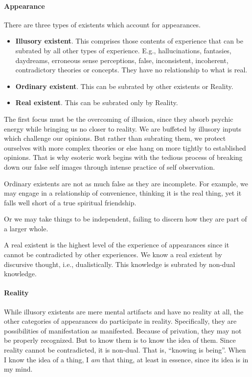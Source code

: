 \paragraph{Appearance}
There are three types of existents which account for appearances.

\begin{itemize}
\item \textbf{Illusory existent}. This comprises those contents of experience that can be subrated by all other types of experience. E.g., hallucinations, fantasies, daydreams, erroneous sense perceptions, false, inconsistent, incoherent, contradictory theories or concepts. They have no relationship to what is real. 
\item \textbf{Ordinary existent}. This can be subrated by other existents or Reality. 
\item \textbf{Real existent}. This can be subrated only by Reality. 
\end{itemize}
The first focus must be the overcoming of illusion, since they absorb psychic energy while bringing us no closer to reality. We are buffeted by illusory inputs which challenge our opinions. But rather than subrating them, we protect ourselves with more complex theories or else hang on more tightly to established opinions. That is why esoteric work begins with the tedious process of breaking down our false self images through intense practice of self observation.

Ordinary existents are not as much false as they are incomplete. For example, we may engage in a relationship of convenience, thinking it is the real thing, yet it falls well short of a true spiritual friendship.

Or we may take things to be independent, failing to discern how they are part of a larger whole.

A real existent is the highest level of the experience of appearances since it cannot be contradicted by other experiences. We know a real existent by discursive thought, i.e., dualistically. This knowledge is subrated by non-dual knowledge.

\paragraph{Reality}
While illusory existents are mere mental artifacts and have no reality at all, the other categories of appearances do participate in reality. Specifically, they are possibilities of manifestation as manifested. Because of privation, they may not be properly recognized. But to know them is to know the idea of them. Since reality cannot be contradicted, it is non-dual. That is, “knowing is being”. When I know the idea of a thing, I \emph{am} that thing, at least in essence, since its idea is in my mind.

